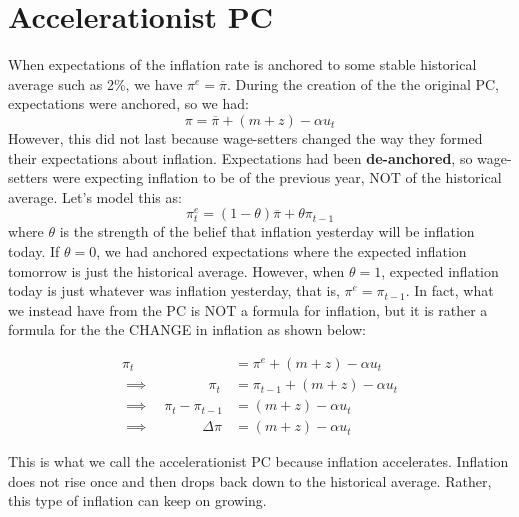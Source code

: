 \documentclass{extarticle}
\begin{document}
\section{Accelerationist PC}
When expectations of the inflation rate is anchored to some stable historical average such as 2\%, we have $\pi^e = \overline{\pi}$. During the creation of the the original PC, expectations were anchored, so we had:
$$\pi = \overline{\pi} + (m+z) - \alpha u_t$$
However, this did not last because wage-setters changed the way they formed their expectations about inflation. Expectations had been \textbf{de-anchored}, so wage-setters were expecting inflation to be of the previous year, NOT of the historical average. Let's model this as:
$$\pi_t^e = (1 - \theta) \overline{\pi} + \theta \pi_{t-1}$$
where $\theta$ is the strength of the belief that inflation yesterday will be inflation today. If $\theta = 0$, we had anchored expectations where the expected inflation tomorrow is just the historical average. 
However, when $\theta = 1$, expected inflation today is just whatever was inflation yesterday, that is, $\pi^e = \pi_{t-1}$. 
In fact, what we instead have from the PC is NOT a formula for inflation, but it is rather a formula for the the CHANGE in inflation as shown below:



\begin{align*}
    \pi_t               &= \pi^e + (m+z) - \alpha u_t \\
    \implies \quad \quad \quad \quad \, \pi_t  &= \pi_{t-1} + (m+z) - \alpha u_t \\
    \implies \quad \pi_t - \pi_{t-1} &= (m+z) - \alpha u_t \\
    \implies \quad \quad \quad \; \; \, \Delta \pi        &= (m+z) - \alpha u_t
\end{align*}

This is what we call the accelerationist PC because inflation accelerates. Inflation does not rise once and then drops back down to the historical average. Rather, this type of inflation can keep on growing.
\end{document}
